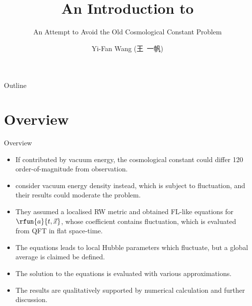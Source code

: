 \documentclass{beamer}
\title%
{An Introduction to \cite{Wang2017}}
\subtitle{An Attempt to Avoid the Old Cosmological Constant Problem}
\author[Wang] %
{Yi-Fan Wang (王\ 一帆)}
\institute[Uni zu Köln] %
{
	Institut für Theoretische Physik\\
	Universität zu Köln}
\begin{document}
\begin{frame}
  \titlepage
\end{frame}

\begin{frame}{Outline}
  \tableofcontents
\end{frame}





\section{Overview}

\begin{frame}{Overview}
\begin{itemize}
\item If contributed by vacuum energy, the cosmological constant could
\alert{differ \num{120} order-of-magnitude} from observation.
\item \citeauthor{Wang2017} consider vacuum energy \alert{density} instead, 
which is subject to \alert{fluctuation}, and their results could moderate the 
problem.
\item They assumed a \alert{localised RW metric} and obtained FL-like equations 
for $\rfun{a}{t,\vec{x}}$, whose coefficient contains fluctuation, which is 
evaluated from QFT in flat space-time.
\item The equations leads to local Hubble parameters which fluctuate, but a
global average is claimed be defined.
\item The solution to the equations is evaluated with various approximations.
\item The results are qualitatively supported by numerical calculation and 
further discussion.
\end{itemize}

\end{frame}
\end{document}
